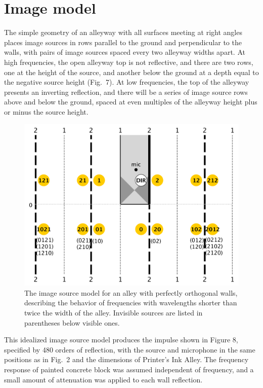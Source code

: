 \documentclass{aes137}
\begin{document}
\section{Image model}

The simple geometry of an alleyway with all surfaces meeting at right
angles places image sources in rows parallel to the ground and
perpendicular to the walls, with pairs of image sources spaced every
two alleyway widths apart. At high frequencies, the open alleyway top
is not reflective, and there are two rows, one at the height of the
source, and another below the ground at a depth equal to the negative
source height (Fig.~7). At low frequencies, the top of the alleyway
presents an inverting reflection, and there will be a series of image
source rows above and below the ground, spaced at even multiples of
the alleyway height plus or minus the source height.

\begin{figure}[h!] \centering \includegraphics[width=\linewidth]{images/ISM_uncanted_v2.pdf} 
\caption{The image source model for an alley with perfectly orthogonal walls, describing the behavior of frequencies with wavelengths shorter than twice the width of the alley. Invisible sources are listed in parentheses below visible ones.} 
\end{figure}

This idealized image source model produces the impulse shown in Figure 8, specified by 480 orders of reflection, with the source and microphone in the same positions as in Fig.~2 and the dimensions of Printer's Ink Alley. The frequency response of painted concrete block was assumed independent of frequency, and a small amount of attenuation was applied to each wall reflection.
\end{document}
